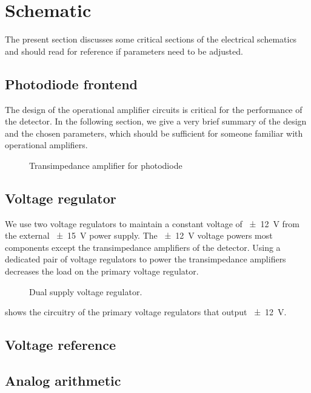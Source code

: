 \section{Schematic}

The present section discusses some critical sections of the electrical schematics and should read for reference if parameters need to be adjusted.

\subsection{Photodiode frontend}

The design of the operational amplifier circuits is critical for the performance of the detector.
In the following section, we give a very brief summary of the design and the chosen parameters, which should be sufficient for someone familiar with operational amplifiers.

\begin{figure}[H]
	\centering
	
 	\caption{Transimpedance amplifier for photodiode}\label{fig:transimpedance_amplifier}
\end{figure}

\subsection{Voltage regulator}

We use two voltage regulators to maintain a constant voltage of \SI{\pm12}{\volt} from the external \SI{\pm15}{\volt} power supply. The \SI{\pm12}{\volt} voltage powers most components except the transimpedance amplifiers of the detector.
Using a dedicated pair of voltage regulators to power the transimpedance amplifiers decreases the load on the primary voltage regulator.

\begin{figure}[H]
	\centering
	
	\caption{Dual supply voltage regulator.}\label{fig:voltage_regulator_dual}
\end{figure}
 shows the circuitry of the primary voltage regulators that output \SI{\pm12}{\volt}.

\subsection{Voltage reference}

\subsection{Analog arithmetic}
